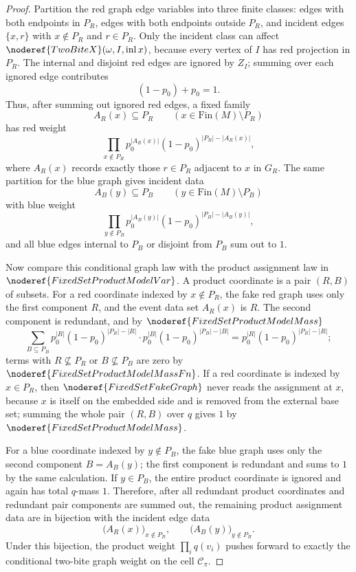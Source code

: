 \begin{proof}
Partition the red graph edge variables into three finite classes:
edges with both endpoints in \(P_R\), edges with both endpoints outside
\(P_R\), and incident edges \(\{x,r\}\) with \(x\notin P_R\) and
\(r\in P_R\).  Only the incident class can affect
\(\noderef{TwoBiteX}(\omega,I,\operatorname{inl} x)\), because every
vertex of \(I\) has red projection in \(P_R\).  The internal and disjoint
red edges are ignored by \(Z_I\); summing over each ignored edge contributes
\[
(1-p_0)+p_0=1.
\]
Thus, after summing out ignored red edges, a fixed family
\[
A_R(x)\subseteq P_R\qquad(x\in\mathrm{Fin}(M)\setminus P_R)
\]
has red weight
\[
\prod_{x\notin P_R}
p_0^{|A_R(x)|}(1-p_0)^{|P_R|-|A_R(x)|},
\]
where \(A_R(x)\) records exactly those \(r\in P_R\) adjacent to \(x\) in
\(G_R\).  The same partition for the blue graph gives incident data
\[
A_B(y)\subseteq P_B\qquad(y\in\mathrm{Fin}(M)\setminus P_B)
\]
with blue weight
\[
\prod_{y\notin P_B}
p_0^{|A_B(y)|}(1-p_0)^{|P_B|-|A_B(y)|},
\]
and all blue edges internal to \(P_B\) or disjoint from \(P_B\) sum out to
\(1\).

Now compare this conditional graph law with the product assignment law in
\(\noderef{FixedSetProductModelVar}\).  A product coordinate is a pair
\((R,B)\) of subsets.  For a red coordinate indexed by
\(x\notin P_R\), the fake red graph uses only the first component
\(R\), and the event data set \(A_R(x)\) is \(R\).  The second component is
redundant, and by \(\noderef{FixedSetProductModelMass}\)
\[
\sum_{B\subseteq P_B}
p_0^{|R|}(1-p_0)^{|P_R|-|R|}
\cdot
p_0^{|B|}(1-p_0)^{|P_B|-|B|}
=p_0^{|R|}(1-p_0)^{|P_R|-|R|};
\]
terms with \(R\not\subseteq P_R\) or \(B\not\subseteq P_B\) are zero by
\(\noderef{FixedSetProductModelMassFn}\).  If a red coordinate is indexed by
\(x\in P_R\), then \(\noderef{FixedSetFakeGraph}\) never reads the assignment
at \(x\), because \(x\) is itself on the embedded side and is removed from the
external base set; summing the whole pair \((R,B)\) over \(q\) gives \(1\) by
\(\noderef{FixedSetProductModelMass}\).

For a blue coordinate indexed by \(y\notin P_B\), the fake blue graph uses
only the second component \(B=A_B(y)\); the first component is redundant and
sums to \(1\) by the same calculation.  If \(y\in P_B\), the entire product
coordinate is ignored and again has total \(q\)-mass \(1\).  Therefore, after
all redundant product coordinates and redundant pair components are summed
out, the remaining product assignment data are in bijection with the incident
edge data
\[
\bigl(A_R(x)\bigr)_{x\notin P_R},
\qquad
\bigl(A_B(y)\bigr)_{y\notin P_B}.
\]
Under this bijection, the product weight \(\prod_iq(v_i)\) pushes forward to
exactly the conditional two-bite graph weight on the cell \(\mathcal C_\pi\).


\end{proof}
